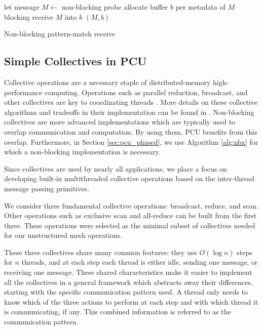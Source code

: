 \begin{algorithm}
\LinesNumbered
{}
let message $M \gets$ non-blocking probe\;
allocate buffer $b$ per metadata of $M$\;
blocking receive $M$ into $b$\;
\Return $(M,b)$\;
\caption{Non-blocking pattern-match receive}
\label{alg:receive}
\end{algorithm}

\subsection{Simple Collectives in PCU}
\label{sec:pcu_coll}

Collective operations are a necessary staple of
distributed-memory high-performance computing.
Operations such as parallel reduction, broadcast, and other collectives
are key to coordinating threads \cite{pjevsivac2007performance}.
More details on these collective algorithms and tradeoffs in their
implementation can be found in \cite{thakur2003improving}.
Non-blocking collectives are more advanced implementations which
are typically used to overlap communication and computation.
By using them, PCU benefits from this overlap.
Furthermore, in Section \ref{sec:pcu_phased}, we use Algorithm \ref{alg:nbx}
for which a non-blocking implementation is necessary.

Since collectives are used by nearly all applications,
we place a focus on developing built-in
multithreaded collective operations based on the
inter-thread message passing primitives.

We consider three fundamental collective operations:
broadcast, reduce, and scan.
Other operations such as exclusive scan and all-reduce
can be built from the first three.
These operations were selected as the minimal subset
of collectives needed for our unstructured mesh operations.

These three collectives share many common features:
they use $O(\log n)$ steps for $n$ threads,
and at each step each thread is either idle, sending one
message, or receiving one message.
These shared characteristics make it easier to implement
all the collectives in a general framework which abstracts
away their differences, starting with the specific communication
pattern used.
A thread only needs to know which of the three actions to perform at each
step and with which thread it is communicating, if any.
This combined information is referred to as the communication pattern.

